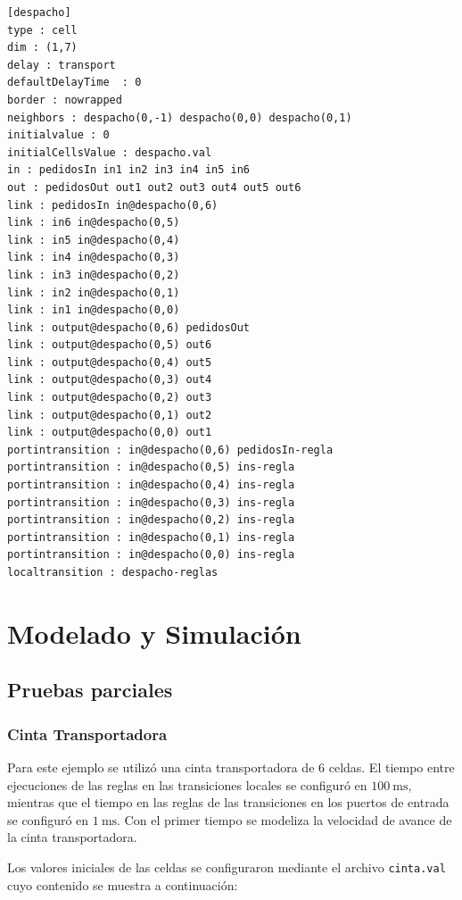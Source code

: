 \documentclass[10pt]{article}
\begin{document}
\begin{minipage}{1\textwidth}
	\centering
	\begin{lstlisting}
[despacho]
type : cell
dim : (1,7)
delay : transport
defaultDelayTime  : 0
border : nowrapped
neighbors : despacho(0,-1) despacho(0,0) despacho(0,1)
initialvalue : 0
initialCellsValue : despacho.val
in : pedidosIn in1 in2 in3 in4 in5 in6
out : pedidosOut out1 out2 out3 out4 out5 out6
link : pedidosIn in@despacho(0,6)
link : in6 in@despacho(0,5)
link : in5 in@despacho(0,4)
link : in4 in@despacho(0,3)
link : in3 in@despacho(0,2)
link : in2 in@despacho(0,1)
link : in1 in@despacho(0,0)
link : output@despacho(0,6) pedidosOut
link : output@despacho(0,5) out6
link : output@despacho(0,4) out5
link : output@despacho(0,3) out4
link : output@despacho(0,2) out3
link : output@despacho(0,1) out2
link : output@despacho(0,0) out1
portintransition : in@despacho(0,6) pedidosIn-regla
portintransition : in@despacho(0,5) ins-regla
portintransition : in@despacho(0,4) ins-regla
portintransition : in@despacho(0,3) ins-regla
portintransition : in@despacho(0,2) ins-regla
portintransition : in@despacho(0,1) ins-regla
portintransition : in@despacho(0,0) ins-regla
localtransition : despacho-reglas
\end{lstlisting}
\end{minipage}



\section{Modelado y Simulación}
\subsection{Pruebas parciales}
\subsubsection{Cinta Transportadora}

Para este ejemplo se utilizó una cinta transportadora de $6$ celdas. El tiempo entre ejecuciones de las reglas en las transiciones locales se configuró en $100~\textrm{ms}$, mientras que el tiempo en las reglas de las transiciones en los puertos de entrada se configuró en $1~\textrm{ms}$. Con el primer tiempo se modeliza la velocidad de avance de la cinta transportadora.

Los valores iniciales de las celdas se configuraron mediante el archivo \texttt{cinta.val} cuyo contenido se muestra a continuación:
\end{document}

